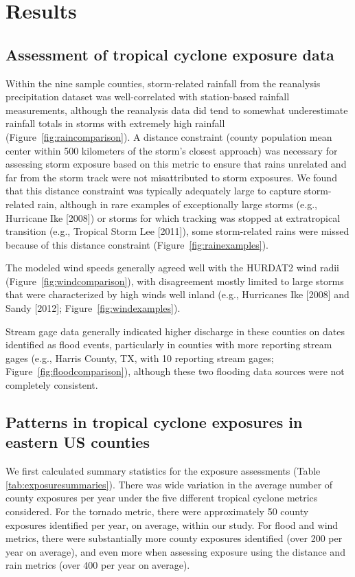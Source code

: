 \section*{Results}

\subsection*{Assessment of tropical cyclone exposure data}

Within
the nine sample counties, storm-related rainfall from the reanalysis precipitation dataset 
was well-correlated with station-based rainfall measurements, although the reanalysis data 
did tend to somewhat underestimate rainfall totals in storms with extremely high rainfall 
(Figure~\ref{fig:raincomparison}). A distance constraint (county population mean center within
500 kilometers of the storm's closest approach) was necessary for assessing storm exposure
based on this metric to ensure that rains unrelated and far from the storm track were not
misattributed to storm exposures. We found that this distance constraint was typically
adequately large to capture storm-related rain, although in rare examples of exceptionally
large storms (e.g., Hurricane Ike [2008]) or storms for which tracking was stopped at
extratropical transition (e.g., Tropical Storm Lee [2011]), some storm-related rains were
missed because of this distance constraint (Figure~\ref{fig:rainexamples}).

The modeled wind speeds generally agreed well
with the HURDAT2 wind radii (Figure~\ref{fig:windcomparison}), with disagreement mostly 
limited to large storms that were characterized by high winds well inland (e.g., Hurricanes
Ike [2008] and Sandy [2012]; Figure~\ref{fig:windexamples}).

Stream gage data generally indicated higher discharge in these
counties on dates identified as flood events, particularly in counties with more reporting
stream gages (e.g., Harris County, TX, with 10 reporting stream gages; 
Figure~\ref{fig:floodcomparison}), although these two flooding data sources were 
not completely
consistent.

\subsection*{Patterns in tropical cyclone exposures in eastern \ac{US} counties}

We first calculated summary statistics for the exposure assessments (Table
\ref{tab:exposuresummaries}). There was wide variation in the average number of
county exposures per year under the five different tropical cyclone metrics
considered. For the tornado metric, there were approximately 50 county
exposures identified per year, on average, within our study.  For flood and
wind metrics, there were substantially more county exposures identified (over
200 per year on average), and even more when assessing exposure using the
distance and rain metrics (over 400 per year on average). 

